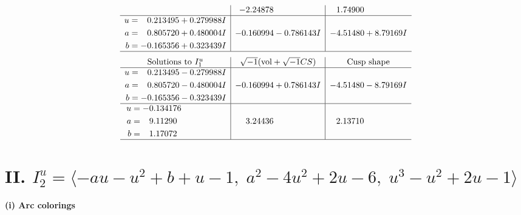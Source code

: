 \documentclass[1p]{elsarticle_modified}
\theoremstyle{definition}
\newcommand{\I}{\sqrt{-1}}
\begin{document}
$$\begin{array}{c|c|c}
 & -2.24878\phantom{ +0.000000I} & \phantom{-}1.74900\phantom{ +0.000000I} \\ \hline\begin{aligned}
u &= \phantom{-}0.213495 + 0.279988 I \\
a &= \phantom{-}0.805720 + 0.480004 I \\
b &= -0.165356 + 0.323439 I\end{aligned}
 & -0.160994 - 0.786143 I & -4.51480 + 8.79169 I\\
 \hline 
 \end{array}$$\newpage$$\begin{array}{c|c|c}  
\text{Solutions to }I^u_{1}& \I (\text{vol} + \sqrt{-1}CS) & \text{Cusp shape}\\
 \hline 
\begin{aligned}
u &= \phantom{-}0.213495 - 0.279988 I \\
a &= \phantom{-}0.805720 - 0.480004 I \\
b &= -0.165356 - 0.323439 I\end{aligned}
 & -0.160994 + 0.786143 I & -4.51480 - 8.79169 I \\ \hline\begin{aligned}
u &= -0.134176\phantom{ +0.000000I} \\
a &= \phantom{-}9.11290\phantom{ +0.000000I} \\
b &= \phantom{-}1.17072\phantom{ +0.000000I}\end{aligned}
 & \phantom{-}3.24436\phantom{ +0.000000I} & \phantom{-}2.13710\phantom{ +0.000000I}\\
 \hline 
 \end{array}$$\newpage\newpage\renewcommand{\arraystretch}{1}
\centering \section*{II. $I^u_{2}= \langle - a u- u^2+b+u-1,\;a^2-4 u^2+2 u-6,\;u^3- u^2+2 u-1 \rangle$}
\flushleft \textbf{(i) Arc colorings}\\
\end{document}
